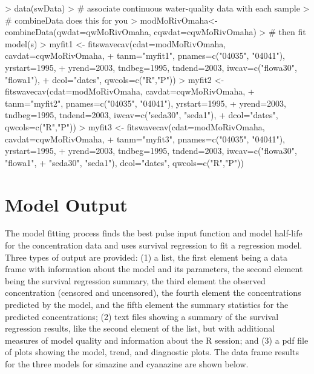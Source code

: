 \documentclass[11pt]{article}
\begin{document}
\begin{Schunk}
\begin{Sinput}
> data(swData)
> # associate continuous water-quality data with each sample
> # combineData does this for you
> modMoRivOmaha<-combineData(qwdat=qwMoRivOmaha, cqwdat=cqwMoRivOmaha)
> # then fit model(s)
> myfit1 <- fitswavecav(cdat=modMoRivOmaha, cavdat=cqwMoRivOmaha,
+ tanm="myfit1", pnames=c("04035", "04041"), yrstart=1995,
+ yrend=2003, tndbeg=1995, tndend=2003, iwcav=c("flowa30", "flowa1"),
+ dcol="dates", qwcols=c("R","P"))
> myfit2 <- fitswavecav(cdat=modMoRivOmaha, cavdat=cqwMoRivOmaha,
+ tanm="myfit2", pnames=c("04035", "04041"), yrstart=1995,
+ yrend=2003, tndbeg=1995, tndend=2003, iwcav=c("seda30", "seda1"),
+ dcol="dates", qwcols=c("R","P"))
> myfit3 <- fitswavecav(cdat=modMoRivOmaha, cavdat=cqwMoRivOmaha,
+ tanm="myfit3", pnames=c("04035", "04041"), yrstart=1995,
+ yrend=2003, tndbeg=1995, tndend=2003, iwcav=c("flowa30", "flowa1",
+ "seda30", "seda1"), dcol="dates", qwcols=c("R","P"))
\end{Sinput}
\end{Schunk}

\section{Model Output}
The model fitting process finds the best pulse input function and model half-life for the concentration data and uses survival regression to fit a regression model.  Three types of output are provided: (1) a list, the first element being a data frame with information about the model and its parameters, the second element being the survival regression summary, the third element the observed concentration (censored and uncensored), the fourth element the concentrations predicted by the model, and the fifth element the summary statistics for the predicted concentrations; (2) text files showing a summary of the survival regression results, like the second element of the list, but with  additional measures of model quality and information about the R session; and (3) a pdf file of plots showing the model, trend, and diagnostic plots.  The data frame results for the three models for simazine and cyanazine are shown below.
\vspace{5 mm}
\end{document}

